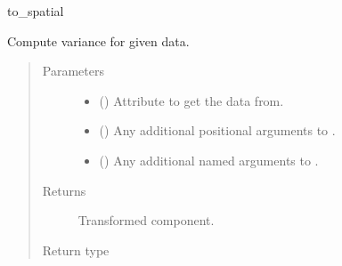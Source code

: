 \documentclass[letterpaper,10pt,english]{sphinxmanual}
\begin{document}
\begin{fulllineitems}
\begin{fulllineitems}
to\_spatial

\end{fulllineitems}


\begin{fulllineitems}
\label{\detokenize{api/base_classes:geology.src.base_spatial.SpatialComponent.variance}}
Compute variance for given data.
\begin{quote}\begin{description}
\item[{Parameters}] \leavevmode\begin{itemize}
\item {} 
 (\sphinxstyleliteralemphasis{\sphinxupquote{, }}) \textendash{} Attribute to get the data from.

\item {} 
 () \textendash{} Any additional positional arguments to .

\item {} 
 () \textendash{} Any additional named arguments to .

\end{itemize}

\item[{Returns}] \leavevmode
{} \textendash{} Transformed component.

\item[{Return type}] \leavevmode
{\hyperref[\detokenize{api/base_classes:geology.src.base_spatial.SpatialComponent}]{}}

\end{description}\end{quote}

\end{fulllineitems}


\end{fulllineitems}
\end{document}
